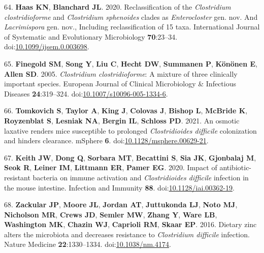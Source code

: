 \documentclass[
  12pt,
]{article}
\newenvironment{cslreferences}%
  {}%
  {\par}
\begin{document}
\begin{cslreferences}
\leavevmode\hypertarget{ref-Haas2020}{}%
64. \textbf{Haas KN}, \textbf{Blanchard JL}. 2020. Reclassification of
the \emph{Clostridium clostridioforme} and \emph{Clostridium sphenoides}
clades as \emph{Enterocloster} gen. nov. And \emph{Lacrimispora} gen.
nov., Including reclassification of 15 taxa. International Journal of
Systematic and Evolutionary Microbiology \textbf{70}:23--34.
doi:\href{https://doi.org/10.1099/ijsem.0.003698}{10.1099/ijsem.0.003698}.

\leavevmode\hypertarget{ref-Finegold2005}{}%
65. \textbf{Finegold SM}, \textbf{Song Y}, \textbf{Liu C}, \textbf{Hecht
DW}, \textbf{Summanen P}, \textbf{Könönen E}, \textbf{Allen SD}. 2005.
\emph{Clostridium clostridioforme}: A mixture of three clinically
important species. European Journal of Clinical Microbiology \&
Infectious Diseases \textbf{24}:319--324.
doi:\href{https://doi.org/10.1007/s10096-005-1334-6}{10.1007/s10096-005-1334-6}.

\leavevmode\hypertarget{ref-Tomkovich2021}{}%
66. \textbf{Tomkovich S}, \textbf{Taylor A}, \textbf{King J},
\textbf{Colovas J}, \textbf{Bishop L}, \textbf{McBride K},
\textbf{Royzenblat S}, \textbf{Lesniak NA}, \textbf{Bergin IL},
\textbf{Schloss PD}. 2021. An osmotic laxative renders mice susceptible
to prolonged \emph{Clostridioides difficile} colonization and hinders
clearance. mSphere \textbf{6}.
doi:\href{https://doi.org/10.1128/msphere.00629-21}{10.1128/msphere.00629-21}.

\leavevmode\hypertarget{ref-Keith2020}{}%
67. \textbf{Keith JW}, \textbf{Dong Q}, \textbf{Sorbara MT},
\textbf{Becattini S}, \textbf{Sia JK}, \textbf{Gjonbalaj M},
\textbf{Seok R}, \textbf{Leiner IM}, \textbf{Littmann ER}, \textbf{Pamer
EG}. 2020. Impact of antibiotic-resistant bacteria on immune activation
and \emph{Clostridioides difficile} infection in the mouse intestine.
Infection and Immunity \textbf{88}.
doi:\href{https://doi.org/10.1128/iai.00362-19}{10.1128/iai.00362-19}.

\leavevmode\hypertarget{ref-Zackular2016}{}%
68. \textbf{Zackular JP}, \textbf{Moore JL}, \textbf{Jordan AT},
\textbf{Juttukonda LJ}, \textbf{Noto MJ}, \textbf{Nicholson MR},
\textbf{Crews JD}, \textbf{Semler MW}, \textbf{Zhang Y}, \textbf{Ware
LB}, \textbf{Washington MK}, \textbf{Chazin WJ}, \textbf{Caprioli RM},
\textbf{Skaar EP}. 2016. Dietary zinc alters the microbiota and
decreases resistance to \emph{Clostridium difficile} infection. Nature
Medicine \textbf{22}:1330--1334.
doi:\href{https://doi.org/10.1038/nm.4174}{10.1038/nm.4174}.


\end{cslreferences}
\end{document}
